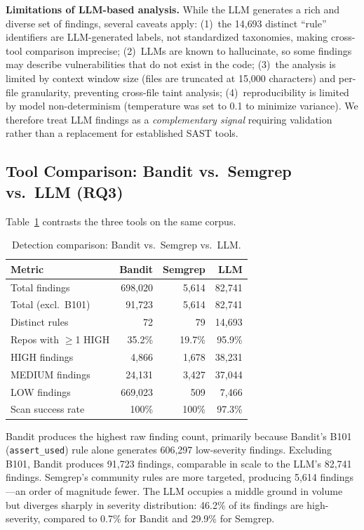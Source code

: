 \documentclass[sigconf,authordraft]{acmart}
\begin{document}
\textbf{Limitations of LLM-based analysis.}
While the LLM generates a rich and diverse set of findings, several
caveats apply: (1)~the 14{,}693 distinct ``rule'' identifiers are
LLM-generated labels, not standardized taxonomies, making cross-tool
comparison imprecise; (2)~LLMs are known to hallucinate, so some
findings may describe vulnerabilities that do not exist in the code;
(3)~the analysis is limited by context window size (files are truncated
at 15{,}000 characters) and per-file granularity, preventing
cross-file taint analysis; (4)~reproducibility is limited by model
non-determinism (temperature was set to 0.1 to minimize variance). We
therefore treat LLM findings as a \emph{complementary signal} requiring
validation rather than a replacement for established SAST tools.

\subsection{Tool Comparison: Bandit vs.\ Semgrep vs.\ LLM (RQ3)}

Table~\ref{tab:tool-comparison} contrasts the three tools on the same
corpus.

\begin{table}[h]
  \caption{Detection comparison: Bandit vs.\ Semgrep vs.\ LLM.}
  \label{tab:tool-comparison}
  \begin{tabular}{lrrr}
    \toprule
    Metric & Bandit & Semgrep & LLM \\
    \midrule
    Total findings            & 698{,}020 & 5{,}614 & 82{,}741 \\
    Total (excl.\ B101)       & 91{,}723  & 5{,}614 & 82{,}741 \\
    Distinct rules            & 72        & 79      & 14{,}693 \\
    Repos with $\geq$1 HIGH   & 35.2\%   & 19.7\%  & 95.9\% \\
    HIGH findings             & 4{,}866   & 1{,}678  & 38{,}231 \\
    MEDIUM findings           & 24{,}131  & 3{,}427  & 37{,}044 \\
    LOW findings              & 669{,}023 & 509      & 7{,}466 \\
    Scan success rate         & 100\%     & 100\%    & 97.3\% \\
    \bottomrule
  \end{tabular}
\end{table}

Bandit produces the highest raw finding count, primarily because
Bandit's B101 (\texttt{assert\_used}) rule alone generates 606{,}297
low-severity findings. Excluding B101, Bandit produces 91{,}723
findings, comparable in scale to the LLM's 82{,}741 findings.
Semgrep's community rules are more targeted, producing 5{,}614
findings---an order of magnitude fewer. The LLM occupies a middle
ground in volume but diverges sharply in severity distribution: 46.2\%
of its findings are high-severity, compared to 0.7\% for Bandit and
29.9\% for Semgrep.
\end{document}
